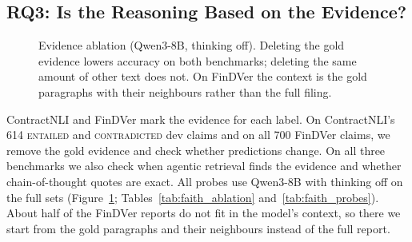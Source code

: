 \documentclass[11pt]{article}
\begin{document}
\subsection{RQ3: Is the Reasoning Based on the Evidence?}
\label{sec:rq3}
\label{sec:faithfulness}

\begin{figure}[t]
\centering
{}
\caption{Evidence ablation (Qwen3-8B, thinking off). Deleting the gold
evidence lowers accuracy on both benchmarks; deleting the same amount of
other text does not. On FinDVer the context is the gold paragraphs with
their neighbours rather than the full filing.}
\label{fig:faith}
\end{figure}

ContractNLI and FinDVer mark the evidence for each label. On ContractNLI's
614 \textsc{entailed} and \textsc{contradicted} dev claims and on all 700
FinDVer claims, we remove the gold evidence and check whether predictions
change. On all three benchmarks we also check when agentic retrieval finds
the evidence and whether chain-of-thought quotes are exact. All probes use
Qwen3-8B with thinking off on the full sets (Figure~\ref{fig:faith};
Tables~\ref{tab:faith_ablation} and~\ref{tab:faith_probes}). About half of
the FinDVer reports do not fit in the model's context, so there we start
from the gold paragraphs and their neighbours instead of the full report.
\end{document}

